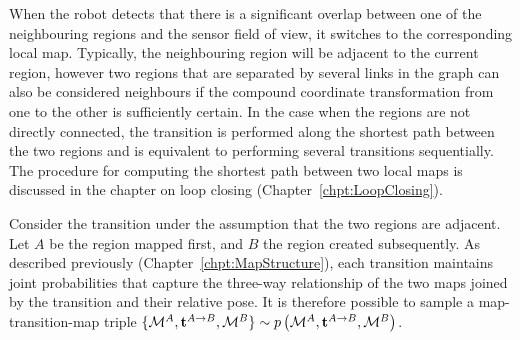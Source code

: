 When the robot detects that there is a significant overlap between one
of the neighbouring regions and the sensor field of view, it switches
to the corresponding local map. Typically, the neighbouring region
will be adjacent to the current region, however two regions that are
separated by several links in the graph can also be considered
neighbours if the compound coordinate transformation from one to the
other is sufficiently certain.  In the case when the regions are not
directly connected, the transition is performed along the shortest
path between the two regions and is equivalent to performing several
transitions sequentially. The procedure for computing the shortest
path between two local maps is discussed in the chapter on loop
closing (Chapter~\ref{chpt:LoopClosing}).

Consider the transition under the assumption that the two regions are
adjacent. Let $A$ be the region mapped first, and $B$ the region
created subsequently. As described previously
(Chapter~\ref{chpt:MapStructure}), each transition maintains joint
probabilities that capture the three-way relationship of the two maps
joined by the transition and their relative pose. It is therefore
possible to sample a map-transition-map triple $\{
{\mapA,\tr{}{A}{B},\mapB} \} \sim \prob{\mapA,\tr{}{A}{B},\mapB} $.
 

